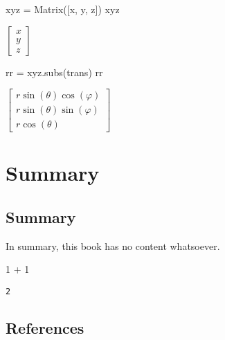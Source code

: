 \documentclass[
  a4paper,
  DIV=11,
  numbers=noendperiod]{scrreprt}
\newenvironment{Shaded}{\begin{snugshade}}{\end{snugshade}}
\newcommand{\DecValTok}[1]{\textcolor[rgb]{0.68,0.00,0.00}{#1}}
\newcommand{\NormalTok}[1]{\textcolor[rgb]{0.00,0.23,0.31}{#1}}
\newcommand{\OperatorTok}[1]{\textcolor[rgb]{0.37,0.37,0.37}{#1}}
\newlength{\cslhangindent}
\newenvironment{CSLReferences}[2] %
 {\begin{list}{}{%
  \setlength{\itemindent}{0pt}
  \setlength{\leftmargin}{0pt}
  \setlength{\parsep}{0pt}
  \ifodd #1
   \setlength{\leftmargin}{\cslhangindent}
   \setlength{\itemindent}{-1\cslhangindent}
  \fi
  \setlength{\itemsep}{#2\baselineskip}}}
 {\end{list}}
\begin{document}
\begin{Shaded}
\begin{Highlighting}[]
\NormalTok{xyz }\OperatorTok{=}\NormalTok{ Matrix([x, y, z])}
\NormalTok{xyz}
\end{Highlighting}
\end{Shaded}

$\displaystyle \left[\begin{matrix}x\\y\\z\end{matrix}\right]$

\begin{Shaded}
\begin{Highlighting}[]
\NormalTok{rr }\OperatorTok{=}\NormalTok{ xyz.subs(trans)}
\NormalTok{rr}
\end{Highlighting}
\end{Shaded}

$\displaystyle \left[\begin{matrix}r \sin{\left(\theta \right)} \cos{\left(\varphi \right)}\\r \sin{\left(\theta \right)} \sin{\left(\varphi \right)}\\r \cos{\left(\theta \right)}\end{matrix}\right]$

\part{Summary}

\chapter{Summary}\label{summary-1}

In summary, this book has no content whatsoever.

\begin{Shaded}
\begin{Highlighting}[]
\DecValTok{1} \OperatorTok{+} \DecValTok{1}
\end{Highlighting}
\end{Shaded}

\begin{verbatim}
2
\end{verbatim}


\chapter*{References}\label{references}


\label{refs}
\begin{CSLReferences}{0}{1}
\end{CSLReferences}
\end{document}
